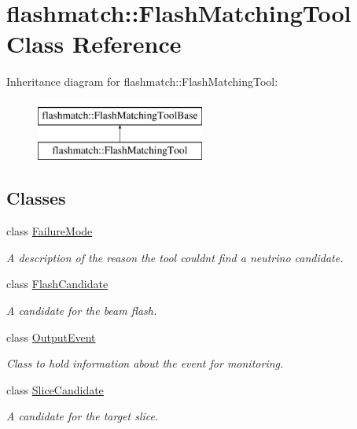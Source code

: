\hypertarget{classflashmatch_1_1FlashMatchingTool}{}\section{flashmatch\+:\+:Flash\+Matching\+Tool Class Reference}
\label{classflashmatch_1_1FlashMatchingTool}
Inheritance diagram for flashmatch\+:\+:Flash\+Matching\+Tool\+:\begin{figure}[H]
\begin{center}
\leavevmode
\includegraphics[height=2.000000cm]{classflashmatch_1_1FlashMatchingTool}
\end{center}
\end{figure}
\subsection*{Classes}
\begin{DoxyCompactItemize}
\item 
class \hyperlink{classflashmatch_1_1FlashMatchingTool_1_1FailureMode}{Failure\+Mode}
\begin{DoxyCompactList}\small\item\em A description of the reason the tool couldn\textquotesingle{}t find a neutrino candidate. \end{DoxyCompactList}\item 
class \hyperlink{classflashmatch_1_1FlashMatchingTool_1_1FlashCandidate}{Flash\+Candidate}
\begin{DoxyCompactList}\small\item\em A candidate for the beam flash. \end{DoxyCompactList}\item 
class \hyperlink{classflashmatch_1_1FlashMatchingTool_1_1OutputEvent}{Output\+Event}
\begin{DoxyCompactList}\small\item\em Class to hold information about the event for monitoring. \end{DoxyCompactList}\item 
class \hyperlink{classflashmatch_1_1FlashMatchingTool_1_1SliceCandidate}{Slice\+Candidate}
\begin{DoxyCompactList}\small\item\em A candidate for the target slice. \end{DoxyCompactList}\end{DoxyCompactItemize}
